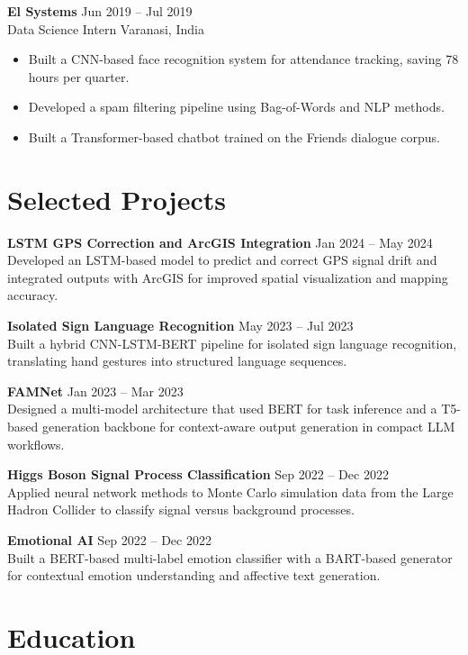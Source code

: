\documentclass[10pt,letterpaper]{article}
\newcommand{\resumeSubheading}[4]{
    \textbf{#1} \hfill #2 \\
    #3 \hfill #4 \\
}
\newcommand{\resumeItem}[1]{
    \item #1
}
\begin{document}
\resumeSubheading
{El Systems}{Jun 2019 -- Jul 2019}
{Data Science Intern}{Varanasi, India}
\begin{itemize}[leftmargin=*, itemsep=2pt, topsep=2pt]
    \resumeItem{Built a CNN-based face recognition system for attendance tracking, saving 78 hours per quarter.}
    \resumeItem{Developed a spam filtering pipeline using Bag-of-Words and NLP methods.}
    \resumeItem{Built a Transformer-based chatbot trained on the Friends dialogue corpus.}
\end{itemize}

\section*{Selected Projects}

\textbf{LSTM GPS Correction and ArcGIS Integration} \hfill Jan 2024 -- May 2024 \\
Developed an LSTM-based model to predict and correct GPS signal drift and integrated outputs with ArcGIS for improved spatial visualization and mapping accuracy.

\vspace{4pt}
\textbf{Isolated Sign Language Recognition} \hfill May 2023 -- Jul 2023 \\
Built a hybrid CNN-LSTM-BERT pipeline for isolated sign language recognition, translating hand gestures into structured language sequences.

\vspace{4pt}
\textbf{FAMNet} \hfill Jan 2023 -- Mar 2023 \\
Designed a multi-model architecture that used BERT for task inference and a T5-based generation backbone for context-aware output generation in compact LLM workflows.

\vspace{4pt}
\textbf{Higgs Boson Signal Process Classification} \hfill Sep 2022 -- Dec 2022 \\
Applied neural network methods to Monte Carlo simulation data from the Large Hadron Collider to classify signal versus background processes.

\vspace{4pt}
\textbf{Emotional AI} \hfill Sep 2022 -- Dec 2022 \\
Built a BERT-based multi-label emotion classifier with a BART-based generator for contextual emotion understanding and affective text generation.

\section*{Education}
\end{document}
